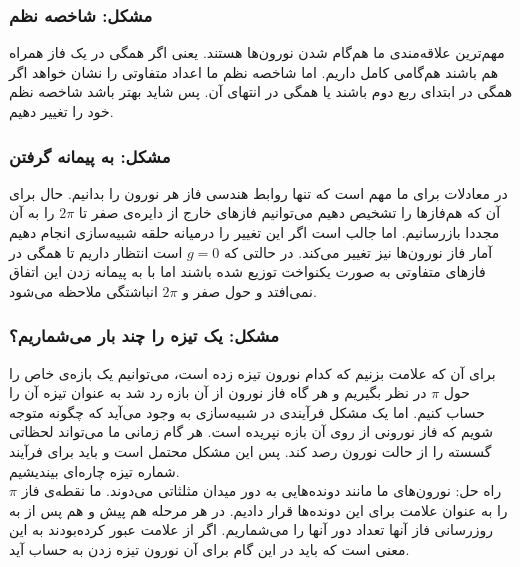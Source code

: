 \documentclass[12pt,onecolumn,a4paper]{article}
\begin{document}
\subsubsection{مشکل: شاخصه نظم}
مهم‌ترین علاقه‌مندی ما هم‌گام شدن نورون‌ها هستند. یعنی اگر همگی در یک فاز همراه هم باشند هم‌گامی کامل داریم. اما شاخصه نظم ما اعداد متفاوتی را نشان خواهد اگر همگی در ابتدای ربع دوم باشند یا همگی در انتهای آن. پس شاید بهتر باشد شاخصه نظم خود را تغییر دهیم.
\subsubsection{مشکل: به پیمانه گرفتن}
در معادلات برای ما مهم است که تنها روابط هندسی فاز هر نورون را بدانیم. حال برای آن که هم‌فازها را تشخیص دهیم می‌توانیم فاز‌های خارج از دایره‌ی صفر تا $2\pi$ را به آن مجددا بازرسانیم. اما جالب است اگر این تغییر را درمیانه حلقه شبیه‌سازی انجام دهیم آمار فاز نورون‌ها نیز تغییر می‌کند. در حالتی که $g=0$ است انتظار داریم تا همگی در فاز‌های متفاوتی به صورت یکنواخت توزیع شده باشند اما با به پیمانه زدن این اتفاق نمی‌افتد و حول صفر و $2\pi$ انباشتگی ملاحظه می‌شود.

\subsubsection{مشکل: یک تیزه را چند بار می‌شماریم؟}
برای آن که علامت بزنیم که کدام نورون تیزه زده است، می‌توانیم یک بازه‌ی خاص را حول $\pi$ در نظر بگیریم و هر گاه فاز نورون از آن بازه رد شد به عنوان تیزه آن را حساب کنیم. اما یک مشکل فرآیندی در شبیه‌سازی به وجود می‌آید که چگونه متوجه شویم که فاز نورونی از روی آن بازه نپریده است. هر گام زمانی ما می‌تواند لحظاتی گسسته را از حالت نورون رصد کند. پس این مشکل محتمل است و باید برای فرآیند شماره تیزه چاره‌ای بیندیشیم.\\

راه حل: نورون‌های ما مانند دونده‌هایی به دور میدان مثلثاتی می‌دوند. ما نقطه‌ی فاز $\pi$ را به عنوان علامت برای این دونده‌ها قرار دادیم. در هر مرحله هم پیش و هم پس از به روزرسانی فاز آنها تعداد دور آنها را می‌شماریم. اگر از علامت عبور کرده‌بودند به این معنی است که باید در این گام برای آن نورون تیزه زدن به حساب آید.
\end{document}
